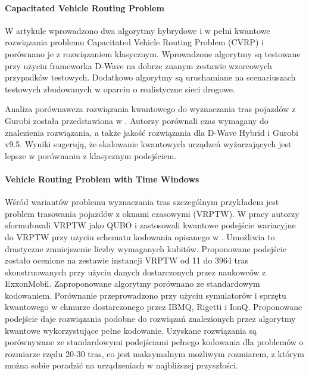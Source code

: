 \documentclass[a4paper,11pt]{article}
\begin{document}
\paragraph{Capacitated Vehicle Routing Problem} W artykule \cite{borowski2020new} wprowadzono dwa algorytmy hybrydowe i w pełni kwantowe rozwiązania problemu Capacitated Vehicle Routing Problem (CVRP) i porównano je z rozwiązaniem klasycznym. Wprowadzone algorytmy są testowane przy użyciu frameworka D-Wave na dobrze znanym zestawie wzorcowych przypadków testowych. Dodatkowo algorytmy są uruchamiane na scenariuszach testowych zbudowanych w oparciu o realistyczne sieci drogowe.

Analiza porównawcza rozwiązania kwantowego do wyznaczania tras pojazdów z Gurobi została przedstawiona w \cite{anil2022performance}. Autorzy porównali czas wymagany do znalezienia rozwiązania, a także jakość rozwiązania dla D-Wave Hybrid i Gurobi v9.5. Wyniki sugerują, że skalowanie kwantowych urządzeń wyżarzających jest lepsze w porównaniu z klasycznym podejściem.


\paragraph{Vehicle Routing Problem with Time Windows}
Wśród wariantów problemu wyznaczania tras szczególnym przykładem jest
problem trasowania pojazdów z oknami czasowymi (VRPTW). W pracy \cite{leonidas2023qubit} autorzy sformułowali VRPTW jako QUBO i zastosowali kwantowe podejście wariacyjne do VRPTW przy użyciu schematu kodowania opisanego w \cite{vikstaal2020applying}. Umożliwia to drastyczne zmniejszenie liczby wymaganych kubitów. Proponowane podejście zostało ocenione na zestawie instancji VRPTW od 11 do 3964 tras skonstruowanych przy użyciu danych dostarczonych przez naukowców z ExxonMobil. Zaproponowane algorytmy porównano ze standardowym kodowaniem. Porównanie przeprowadzono przy użyciu symulatorów i sprzętu kwantowego w chmurze dostarczonego przez IBMQ, Rigetti i IonQ. Proponowane podejście daje rozwiązania podobne do rozwiązań znalezionych przez algorytmy kwantowe wykorzystujące pełne kodowanie. Uzyskane rozwiązania są porównywane ze standardowymi podejściami pełnego kodowania dla problemów o rozmiarze rzędu 20-30 tras, co jest maksymalnym możliwym rozmiarem, z którym można sobie poradzić na urządzeniach w najbliższej przyszłości.

\end{document}
